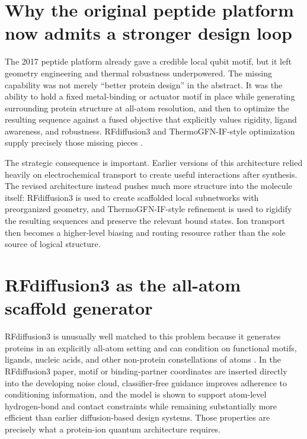 \documentclass[11pt]{report}
\theoremstyle{definition}
\begin{document}
\section{Why the original peptide platform now admits a stronger design loop}
The 2017 peptide platform already gave a credible local qubit motif, but it left geometry engineering and thermal robustness underpowered. The missing capability was not merely ``better protein design'' in the abstract. It was the ability to hold a fixed metal-binding or actuator motif in place while generating surrounding protein structure at all-atom resolution, and then to optimize the resulting sequence against a fused objective that explicitly values rigidity, ligand awareness, and robustness. RFdiffusion3 and ThermoGFN-IF-style optimization supply precisely those missing pieces \cite{rfdiffusion32025,thermogfnif2026}.

The strategic consequence is important. Earlier versions of this architecture relied heavily on electrochemical transport to create useful interactions after synthesis. The revised architecture instead pushes much more structure into the molecule itself: RFdiffusion3 is used to create scaffolded local subnetworks with preorganized geometry, and ThermoGFN-IF-style refinement is used to rigidify the resulting sequences and preserve the relevant bound states. Ion transport then becomes a higher-level biasing and routing resource rather than the sole source of logical structure.

\section{RFdiffusion3 as the all-atom scaffold generator}
RFdiffusion3 is unusually well matched to this problem because it generates proteins in an explicitly all-atom setting and can condition on functional motifs, ligands, nucleic acids, and other non-protein constellations of atoms \cite{rfdiffusion32025}. In the RFdiffusion3 paper, motif or binding-partner coordinates are inserted directly into the developing noise cloud, classifier-free guidance improves adherence to conditioning information, and the model is shown to support atom-level hydrogen-bond and contact constraints while remaining substantially more efficient than earlier diffusion-based design systems. Those properties are precisely what a protein-ion quantum architecture requires.
\end{document}
